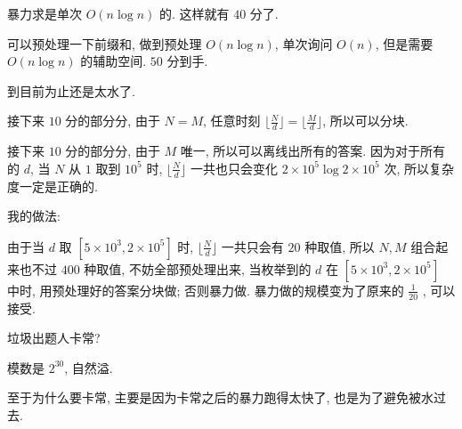 \documentclass[12pt,a4paper]{article}
\begin{document}
暴力求是单次 $O(n \log n)$ 的. 这样就有 $40$ 分了.

可以预处理一下前缀和, 做到预处理 $O(n \log n)$, 单次询问 $O(n)$, 但是需要 $O(n \log n)$ 的辅助空间. $50$ 分到手.

到目前为止还是太水了.

接下来 $10$ 分的部分分, 由于 $N = M$, 任意时刻 $\lfloor\frac{N}{d}\rfloor = \lfloor\frac{M}{d}\rfloor$, 所以可以分块.

接下来 $10$ 分的部分分, 由于 $M$ 唯一, 所以可以离线出所有的答案. 因为对于所有的 $d$, 当 $N$ 从 $1$ 取到 $10^5$ 时, $\lfloor\frac{N}{d}\rfloor$ 一共也只会变化 $2 \times 10^5 \log 2 \times 10^5$ 次, 所以复杂度一定是正确的.

我的做法:

由于当 $d$ 取 $[5 \times 10^3, 2 \times 10^5]$ 时, $\lfloor \frac{N}{d} \rfloor$ 一共只会有 $20$ 种取值, 所以 $N, M$ 组合起来也不过 $400$ 种取值, 不妨全部预处理出来, 当枚举到的 $d$ 在 $[5 \times 10^3, 2 \times 10^5]$ 中时, 用预处理好的答案分块做; 否则暴力做. 暴力做的规模变为了原来的 $\frac{1}{20}$ , 可以接受.

垃圾出题人卡常?

模数是 $2^{30}$, 自然溢.

至于为什么要卡常, 主要是因为卡常之后的暴力跑得太快了, 也是为了避免被水过去.
\end{document}
